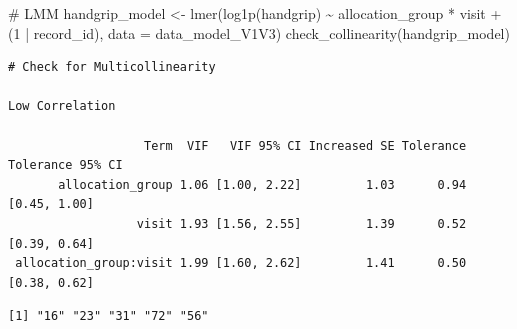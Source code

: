 \documentclass[
  12pt,
]{article}
\newenvironment{Shaded}{\begin{snugshade}}{\end{snugshade}}
\newcommand{\AttributeTok}[1]{\textcolor[rgb]{0.40,0.45,0.13}{#1}}
\newcommand{\CommentTok}[1]{\textcolor[rgb]{0.37,0.37,0.37}{#1}}
\newcommand{\DecValTok}[1]{\textcolor[rgb]{0.68,0.00,0.00}{#1}}
\newcommand{\FunctionTok}[1]{\textcolor[rgb]{0.28,0.35,0.67}{#1}}
\newcommand{\NormalTok}[1]{\textcolor[rgb]{0.00,0.23,0.31}{#1}}
\newcommand{\OtherTok}[1]{\textcolor[rgb]{0.00,0.23,0.31}{#1}}
\newcommand{\SpecialCharTok}[1]{\textcolor[rgb]{0.37,0.37,0.37}{#1}}
\newcommand{\StringTok}[1]{\textcolor[rgb]{0.13,0.47,0.30}{#1}}
\begin{document}
\begin{Shaded}
\begin{Highlighting}[]
\CommentTok{\# LMM}
\NormalTok{handgrip\_model }\OtherTok{\textless{}{-}} \FunctionTok{lmer}\NormalTok{(}\FunctionTok{log1p}\NormalTok{(handgrip) }\SpecialCharTok{\textasciitilde{}}\NormalTok{ allocation\_group }\SpecialCharTok{*}\NormalTok{ visit }\SpecialCharTok{+} 
\NormalTok{(}\DecValTok{1} \SpecialCharTok{|}\NormalTok{ record\_id), }\AttributeTok{data =}\NormalTok{ data\_model\_V1V3)}
\FunctionTok{check\_collinearity}\NormalTok{(handgrip\_model)}
\end{Highlighting}
\end{Shaded}

\begin{verbatim}
# Check for Multicollinearity

Low Correlation

                   Term  VIF   VIF 95% CI Increased SE Tolerance Tolerance 95% CI
       allocation_group 1.06 [1.00, 2.22]         1.03      0.94     [0.45, 1.00]
                  visit 1.93 [1.56, 2.55]         1.39      0.52     [0.39, 0.64]
 allocation_group:visit 1.99 [1.60, 2.62]         1.41      0.50     [0.38, 0.62]
\end{verbatim}

\begin{Shaded}
\end{Shaded}

\begin{verbatim}
[1] "16" "23" "31" "72" "56"
\end{verbatim}
\end{document}
